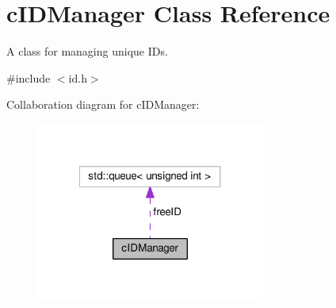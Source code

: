 \hypertarget{classcIDManager}{\section{c\-I\-D\-Manager \-Class \-Reference}
\label{de/dd4/classcIDManager}
}


\-A class for managing unique \-I\-Ds.  




{\ttfamily \#include $<$id.\-h$>$}



\-Collaboration diagram for c\-I\-D\-Manager\-:\nopagebreak
\begin{figure}[H]
\begin{center}
\leavevmode
\includegraphics[width=212pt]{db/d8e/classcIDManager__coll__graph}
\end{center}
\end{figure}
